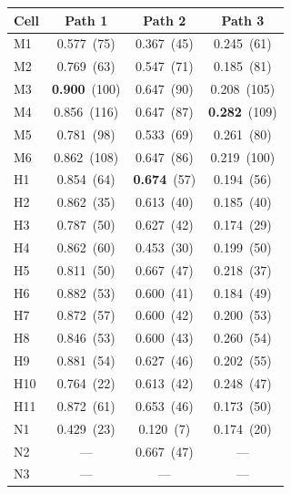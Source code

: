 
\noindent
{}
\label{tab:closure_rate_matrix}

\smallskip

{\centering
\begin{tabular}{@{}lccc@{}}
\toprule
Cell & Path 1 & Path 2 & Path 3 \\
\midrule
M1   & 0.577~(75) & 0.367~(45) & 0.245~(61) \\
M2   & 0.769~(63) & 0.547~(71) & 0.185~(81) \\
M3   & \textbf{0.900}~(100) & 0.647~(90) & 0.208~(105) \\
M4   & 0.856~(116) & 0.647~(87) & \textbf{0.282}~(109) \\
M5   & 0.781~(98) & 0.533~(69) & 0.261~(80) \\
M6   & 0.862~(108) & 0.647~(86) & 0.219~(100) \\
\midrule
H1   & 0.854~(64) & \textbf{0.674}~(57) & 0.194~(56) \\
H2   & 0.862~(35) & 0.613~(40) & 0.185~(40) \\
H3   & 0.787~(50) & 0.627~(42) & 0.174~(29) \\
H4   & 0.862~(60) & 0.453~(30) & 0.199~(50) \\
H5   & 0.811~(50) & 0.667~(47) & 0.218~(37) \\
H6   & 0.882~(53) & 0.600~(41) & 0.184~(49) \\
H7   & 0.872~(57) & 0.600~(42) & 0.200~(53) \\
H8   & 0.846~(53) & 0.600~(43) & 0.260~(54) \\
H9   & 0.881~(54) & 0.627~(46) & 0.202~(55) \\
H10  & 0.764~(22) & 0.613~(42) & 0.248~(47) \\
H11  & 0.872~(61) & 0.653~(46) & 0.173~(50) \\
\midrule
N1   & 0.429~(23) & 0.120~(7) & 0.174~(20) \\
N2   & --- & 0.667~(47) & --- \\
N3   & --- & --- & --- \\
\bottomrule
\end{tabular}
\par}

\medskip
